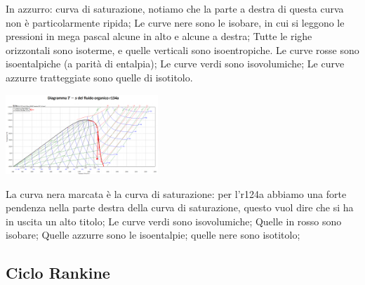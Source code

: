 In azzurro: curva di saturazione, notiamo che la parte a destra di questa curva non è particolarmente ripida;\newline
Le curve nere sono le isobare, in cui si leggono le pressioni in mega pascal alcune in alto e alcune a destra;\newline
Tutte le righe orizzontali sono isoterme, e quelle verticali sono isoentropiche.\newline
Le curve rosse sono isoentalpiche (a parità di entalpia); \newline
Le curve verdi sono isovolumiche;\newline
Le curve azzurre tratteggiate sono quelle di isotitolo.
\begin{center}
    \includegraphics[height=3cm]{../L08/img4.PNG}
\end{center}
La curva nera marcata è la curva di saturazione: per l'r124a abbiamo una forte pendenza nella parte destra della curva di saturazione, questo vuol dire che si ha in uscita un alto titolo;\newline
Le curve verdi sono isovolumiche;\newline
Quelle in rosso sono isobare;\newline
Quelle azzurre sono le isoentalpie;\newline
quelle nere sono isotitolo;
\subsection{Ciclo Rankine}
